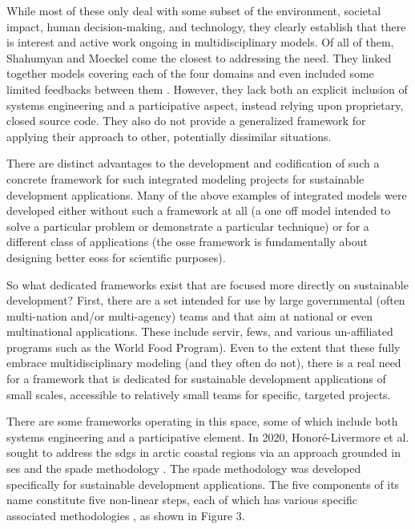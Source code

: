 While most of these only deal with some subset of the environment, societal impact, human decision-making, and technology, they clearly establish that there is interest and active work ongoing in multidisciplinary models. Of all of them, Shahumyan and Moeckel come the closest to addressing the need. They linked together models covering each of the four domains and even included some limited feedbacks between them \cite{shahumyanIntegrationLandUse2017}. However, they lack both an explicit inclusion of systems engineering and a participative aspect, instead relying upon proprietary, closed source code. They also do not provide a generalized framework for applying their approach to other, potentially dissimilar situations.

There are distinct advantages to the development and codification of such a concrete framework for such integrated modeling projects for sustainable development applications. Many of the above examples of integrated models were developed either without such a framework at all (a one off model intended to solve a particular problem or demonstrate a particular technique) or for a different class of applications (the \ac{osse} framework is fundamentally about designing better \acp{eos} for scientific purposes). 

So what dedicated frameworks exist that are focused more directly on sustainable development? First, there are a set intended for use by large governmental (often multi-nation and/or multi-agency) teams and that aim at national or even multinational applications. These include \ac{servir}, \ac{fews}, and various \ac{un}-affiliated programs such as the World Food Program). Even to the extent that these fully embrace multidisciplinary modeling (and they often do not), there is a real need for a framework that is dedicated for sustainable development applications of small scales, accessible to relatively small teams for specific, targeted projects.

There are some frameworks operating in this space, some of which include both systems engineering and a participative element. In 2020, Honoré-Livermore et al. sought to address the \acp{sdg} in arctic coastal regions via an approach grounded in \ac{ses} and the \ac{spade} methodology \cite{honore-livermoreAddressingSustainableDevelopment2020}. The \ac{spade} methodology was developed specifically for sustainable development applications. The five components of its name constitute five non-linear steps, each of which has various specific associated methodologies \cite{haskinsSystemsEngineeringAnalyzed2008}, as shown in Figure 3.

